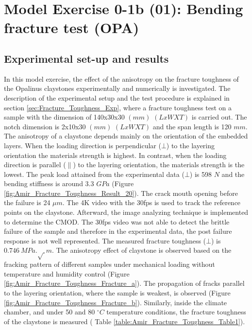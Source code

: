 \section{Model Exercise 0-1b (01): Bending fracture test (OPA)}
\label{sec:mex01b}

\subsection{Experimental set-up and results}

In this model exercise, the effect of the anisotropy on the fracture toughness of the Opalinus claystones experimentally and numerically is investigated. The description of the experimental setup and the test procedure is explained in section \ref{sec:Fracture_Toughness_Exp}, where a fracture toughness test on a sample with the dimension of 140x30x30 $(mm)$ $(LxWXT)$ is carried out. The notch dimension is 2x10x30 $(mm)$ $(LxWXT)$ and the span length is 120 $mm$. The anisotropy of a claystone depends mainly on the orientation of the embedded layers. When the loading direction is perpendicular ($\bot$) to the layering orientation the materials strength is highest. In contrast, when the loading direction is parallel ($\parallel$) to the layering orientation, the materials strength is the lowest. The peak load attained from the experimental data ($\bot$) is 598 $N$ and the bending stiffness is around 3.3 $GPa$ (Figure \ref{fig:Amir_Fracture_Toughness_Result_20}). The crack mouth opening before the failure is 24 $\mu m$. The 4K video with the 30fps is used to track the reference points on the claystone. Afterward, the image analyzing technique is implemented to determine the CMOD. The 30fps video was not able to detect the brittle failure of the sample and therefore in the experimental data, the post failure response is not well represented. The measured fracture toughness ($\bot$) is $0.746\ MPa.\sqrt\ m$. The anisotropy effect of claystone is observed based on the fracking pattern of different samples under mechanical loading without temperature and humidity control (Figure \ref{fig:Amir_Fracture_Toughness_Fracture_a}). The propagation of fracks parallel to the layering orientation, where the sample is weakest, is observed (Figure \ref{fig:Amir_Fracture_Toughness_Fracture_b}). Similarly, inside the climate chamber, and under 50 and 80 $^{\circ}C$ temperature conditions, the fracture toughness of the claystone is measured ( Table \ref{table:Amir_Fracture_Toughness_Table1}).

